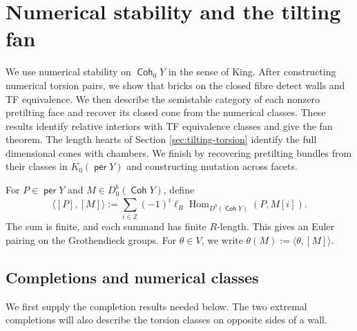 \documentclass[a4paper,reqno]{amsart}
\DeclareMathOperator{\Coh}{\mathsf{Coh}}
\DeclareMathOperator{\per}{\mathsf{per}}
\DeclareMathOperator{\Hom}{Hom}
\theoremstyle{definition}
\begin{document}
\section{Numerical stability and the tilting fan}\label{sec:stability-fan}

We use numerical stability on $\Coh_0Y$ in the sense of King. After constructing numerical torsion pairs, we show that bricks on the closed fibre detect walls and TF equivalence. We then describe the semistable category of each nonzero pretilting face and recover its closed cone from the numerical classes. These results identify relative interiors with TF equivalence classes and give the fan theorem. The length hearts of Section \ref{sec:tilting-torsion} identify the full dimensional cones with chambers. We finish by recovering pretilting bundles from their classes in $K_0(\per Y)$ and constructing mutation across facets.

For $P\in\per Y$ and $M\in D^b_0(\Coh Y)$, define
\begin{equation}\label{eq:euler-pairing}
\langle[P],[M]\rangle
:=\sum_{i\in\mathbb Z}(-1)^i\ell_R\Hom_{D^b(\Coh Y)}(P,M[i]).
\end{equation}
The sum is finite, and each summand has finite $R$-length. This gives an Euler pairing on the Grothendieck groups. For $\theta\in V$, we write $\theta(M):=\langle\theta,[M]\rangle$.

\subsection{Completions and numerical classes}

We first supply the completion results needed below. The two extremal completions will also describe the torsion classes on opposite sides of a wall.
\end{document}
